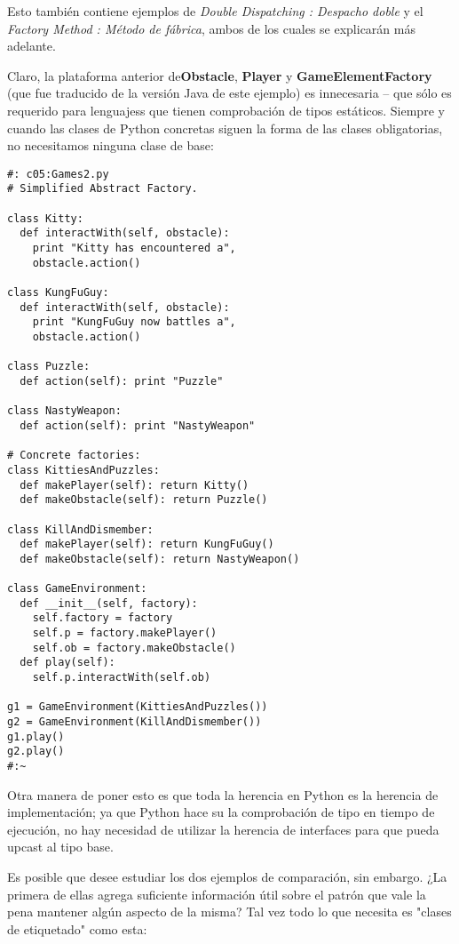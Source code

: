 Esto también contiene ejemplos de \textit{Double Dispatching : Despacho doble} y el \textit{Factory Method : Método de fábrica}, ambos de los cuales se explicarán más adelante.  \newline

Claro, la plataforma anterior de\textbf{Obstacle}, \textbf{Player} y \textbf{GameElementFactory} (que fue traducido de la versión Java de este ejemplo) es innecesaria – que sólo es requerido para lenguajess que tienen comprobación de tipos estáticos. Siempre y cuando las clases de Python concretas siguen la forma de las clases obligatorias, no necesitamos ninguna clase de base:  \newline

\begin{lstlisting}  
#: c05:Games2.py 
# Simplified Abstract Factory. 

class Kitty: 
  def interactWith(self, obstacle): 
    print "Kitty has encountered a", 
    obstacle.action() 
    
class KungFuGuy: 
  def interactWith(self, obstacle): 
    print "KungFuGuy now battles a", 
    obstacle.action() 
    
class Puzzle: 
  def action(self): print "Puzzle"  
  
class NastyWeapon: 
  def action(self): print "NastyWeapon"  
  
# Concrete factories:
class KittiesAndPuzzles: 
  def makePlayer(self): return Kitty() 
  def makeObstacle(self): return Puzzle() 
  
class KillAndDismember: 
  def makePlayer(self): return KungFuGuy() 
  def makeObstacle(self): return NastyWeapon() 
  
class GameEnvironment: 
  def __init__(self, factory): 
    self.factory = factory 
    self.p = factory.makePlayer()  
    self.ob = factory.makeObstacle() 
  def play(self):  
    self.p.interactWith(self.ob)  
    
g1 = GameEnvironment(KittiesAndPuzzles()) 
g2 = GameEnvironment(KillAndDismember()) 
g1.play()  
g2.play()  
#:~ 
\end{lstlisting}

Otra manera de poner esto es que toda la herencia en Python es la herencia de implementación; ya que Python hace su la comprobación de tipo en tiempo de ejecución, no hay necesidad de utilizar la herencia de interfaces para que pueda upcast al tipo base.  \newline

Es posible que desee estudiar los dos ejemplos de comparación, sin embargo. ¿La primera de ellas agrega suficiente información útil sobre el patrón que vale la pena mantener algún aspecto de la misma? Tal vez todo lo que necesita es "clases de etiquetado" como esta:    \newline

